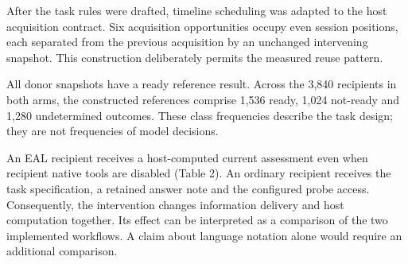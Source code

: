 \documentclass[
  11pt,
]{article}
\begin{document}
After the task rules were drafted, timeline scheduling was adapted to
the host acquisition contract. Six acquisition opportunities occupy even
session positions, each separated from the previous acquisition by an
unchanged intervening snapshot. This construction deliberately permits
the measured reuse pattern.

All donor snapshots have a ready reference result. Across the 3,840
recipients in both arms, the constructed references comprise 1,536
ready, 1,024 not-ready and 1,280 undetermined outcomes. These class
frequencies describe the task design; they are not frequencies of model
decisions.

An EAL recipient receives a host-computed current assessment even when
recipient native tools are disabled (Table 2). An ordinary recipient
receives the task specification, a retained answer note and the
configured probe access. Consequently, the intervention changes
information delivery and host computation together. Its effect can be
interpreted as a comparison of the two implemented workflows. A claim
about language notation alone would require an additional comparison.
\end{document}
